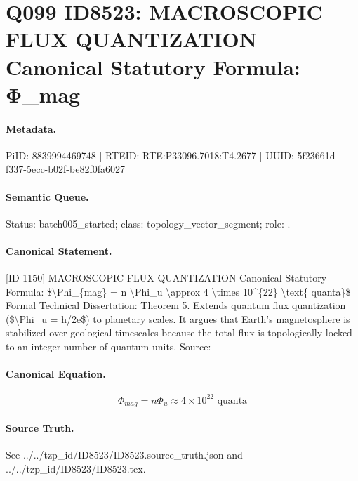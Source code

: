 \section*{Q099 ID8523: MACROSCOPIC FLUX QUANTIZATION Canonical Statutory Formula: Φ\_mag}
\paragraph{Metadata.}
PiID: 8839994469748 | RTEID: RTE:P33096.7018:T4.2677 | UUID: 5f23661d-f337-5ecc-b02f-be82f0fa6027

\paragraph{Semantic Queue.}
Status: batch005\_started; class: topology\_vector\_segment; role: .

\paragraph{Canonical Statement.}
[ID 1150] MACROSCOPIC FLUX QUANTIZATION Canonical Statutory Formula: \$\textbackslash{}Phi\_\{mag\} = n \textbackslash{}Phi\_u \textbackslash{}approx 4 \textbackslash{}times 10\textasciicircum{}\{22\} \textbackslash{}text\{ quanta\}\$ Formal Technical Dissertation: Theorem 5. Extends quantum flux quantization (\$\textbackslash{}Phi\_u = h/2e\$) to planetary scales. It argues that Earth's magnetosphere is stabilized over geological timescales because the total flux is topologically locked to an integer number of quantum units. Source:

\paragraph{Canonical Equation.}
\[
\Phi_{mag} = n \Phi_u \approx 4 \times 10^{22} \text{ quanta}
\]

\paragraph{Source Truth.}
See ../../tzp\_id/ID8523/ID8523.source\_truth.json and ../../tzp\_id/ID8523/ID8523.tex.
